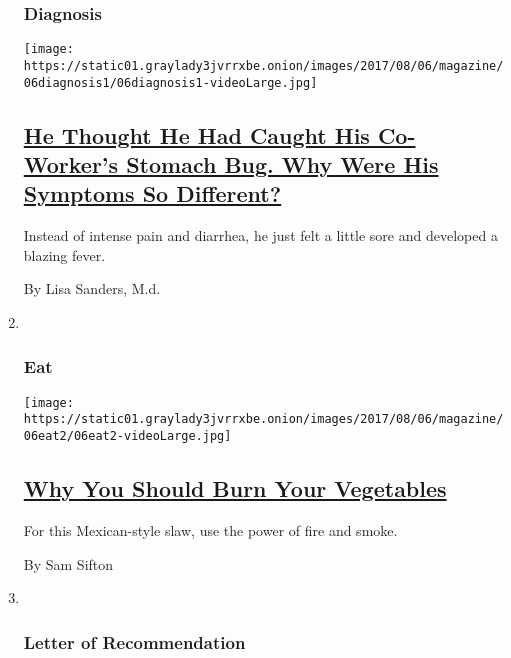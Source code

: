 \begin{enumerate}
{  \subsubsection{Diagnosis}\label{diagnosis}}

  \texttt{[image: https://static01.graylady3jvrrxbe.onion/images/2017/08/06/magazine/06diagnosis1/06diagnosis1-videoLarge.jpg]}

  \hypertarget{he-thought-he-had-caught-his-co-workers-stomach-bug-why-were-his-symptoms-so-different}{%
  \subsection{\texorpdfstring{\href{/2017/08/03/magazine/he-thought-he-had-caught-his-co-workers-stomach-bug-why-were-his-symptoms-so-different.html}{He
  Thought He Had Caught His Co-Worker's Stomach Bug. Why Were His
  Symptoms So
  Different?}}{He Thought He Had Caught His Co-Worker's Stomach Bug. Why Were His Symptoms So Different?}}\label{he-thought-he-had-caught-his-co-workers-stomach-bug-why-were-his-symptoms-so-different}}

  Instead of intense pain and diarrhea, he just felt a little sore and
  developed a blazing fever.

  By Lisa Sanders, M.d.
\item ~
  \hypertarget{eat}{%
  \subsubsection{Eat}\label{eat}}

  \texttt{[image: https://static01.graylady3jvrrxbe.onion/images/2017/08/06/magazine/06eat2/06eat2-videoLarge.jpg]}

  \hypertarget{why-you-should-burn-your-vegetables}{%
  \subsection{\texorpdfstring{\href{/2017/08/03/magazine/why-you-should-burn-your-vegetables.html}{Why
  You Should Burn Your
  Vegetables}}{Why You Should Burn Your Vegetables}}\label{why-you-should-burn-your-vegetables}}

  For this Mexican-style slaw, use the power of fire and smoke.

  By Sam Sifton
\item ~
  \hypertarget{letter-of-recommendation}{%
  \subsubsection{Letter of
  Recommendation}\label{letter-of-recommendation}}


\end{enumerate}
